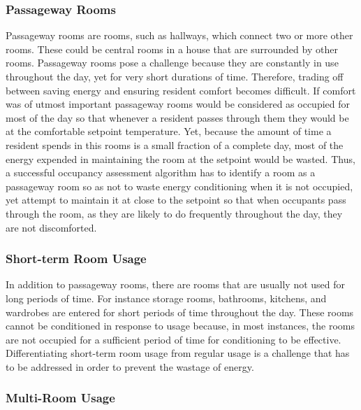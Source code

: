 \subsubsection{Passageway Rooms}
Passageway rooms are rooms, such as hallways, which connect two or more other
rooms. These could be central rooms in a house that are surrounded by other
rooms. Passageway rooms pose a challenge because they are constantly in use
throughout the day, yet for very short durations of time. Therefore, trading off
between saving energy and ensuring resident comfort becomes difficult. If
comfort was of utmost important passageway rooms would be considered as occupied
for most of the day so that whenever a resident passes through them they would
be at the comfortable setpoint temperature. Yet, because the amount of time a
resident spends in this rooms is a small fraction of a complete day, most of the
energy expended in maintaining the room at the setpoint would be
wasted. Thus, a successful occupancy assessment algorithm has to identify a room
as a passageway room so as not to waste energy conditioning when it is not
occupied, yet attempt to maintain it at close to the setpoint so that when
occupants pass through the room, as they are likely to do frequently throughout
the day, they are not discomforted. 

\subsubsection{Short-term Room Usage}


In addition to passageway rooms, there are rooms that are usually not used for
long periods of time. For instance storage rooms, bathrooms, kitchens, and
wardrobes are entered for short periods of time throughout the day. These rooms
cannot be conditioned in response to usage because, in most instances, the rooms
are not occupied for a sufficient period of time for conditioning to be
effective. Differentiating short-term room usage from regular usage is a
challenge that has to be addressed in order to prevent the wastage of energy.

\subsubsection{Multi-Room Usage}


